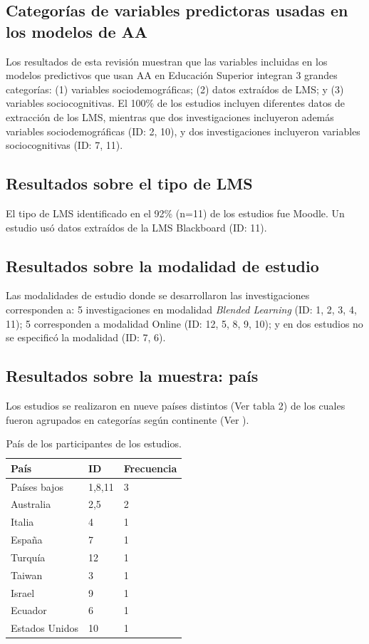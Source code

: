 \documentclass[spanish]{textolivre}
\begin{document}
\subsection*{Categorías de variables predictoras usadas en los modelos de AA}
Los resultados de esta revisión muestran que las variables incluidas en los modelos predictivos que usan AA en Educación Superior integran 3 grandes categorías: (1) variables sociodemográficas; (2) datos extraídos de LMS; y (3) variables sociocognitivas. El 100\% de los estudios incluyen diferentes datos de extracción de los LMS, mientras que dos investigaciones incluyeron además variables sociodemográficas (ID: 2, 10), y dos investigaciones incluyeron variables sociocognitivas (ID: 7, 11).

\subsection*{Resultados sobre el tipo de LMS}
El tipo de LMS identificado en el 92\% (n=11) de los estudios fue Moodle. Un estudio usó datos extraídos de la LMS Blackboard (ID: 11).

\subsection*{Resultados sobre la modalidad de estudio}
Las modalidades de estudio donde se desarrollaron las investigaciones corresponden a: 5 investigaciones en modalidad \emph{Blended Learning} (ID: 1, 2, 3, 4, 11); 5 corresponden a modalidad Online (ID: 12, 5, 8, 9, 10); y en dos estudios no se especificó la modalidad (ID: 7, 6).

\subsection*{Resultados sobre la muestra: país}
Los estudios se realizaron en nueve países distintos (Ver tabla 2) de los cuales fueron agrupados en categorías según continente (Ver ).

\begin{table}[htpb]
\caption{País de los participantes de los estudios.}
\label{tab2}
\centering
\begin{tabular}{lll}
\toprule 
País & ID & Frecuencia
\\ 
\midrule
Países bajos & 1,8,11 & 3
\\
Australia & 2,5 & 2
\\
Italia & 4 & 1
\\
España & 7 & 1
\\
Turquía & 12 & 1
\\
Taiwan & 3 & 1
\\
Israel & 9 & 1
\\
Ecuador & 6 & 1
\\
Estados Unidos & 10 & 1
\\ 
\bottomrule
\end{tabular}
\end{table}
\end{document}
